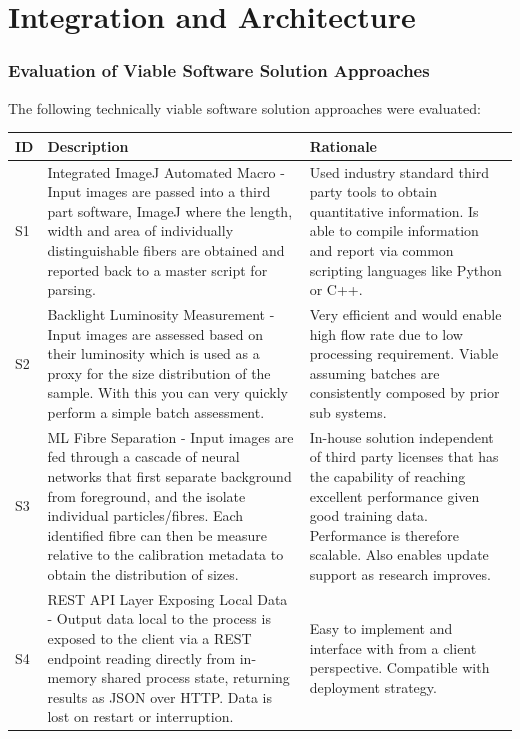 \documentclass[11pt,a4paper]{article}
\begin{document}
\part{Integration and Architecture}

\section{Evaluation of Viable Software Solution Approaches}

The following technically viable software solution approaches were evaluated:

\begin{longtable}{@{}p{1cm}p{7cm}p{7cm}@{}}
\toprule
\textbf{ID} & \textbf{Description} & \textbf{Rationale} \\
\midrule
\endhead
S1 & Integrated ImageJ Automated Macro - Input images are passed into a third part software, ImageJ where the length, width and area of individually distinguishable fibers are  obtained and reported back to a master script for parsing. & Used industry standard third party tools to obtain quantitative information. Is able to compile information and report via common scripting languages like Python or C++. \\ \midrule

S2 & Backlight Luminosity Measurement - Input images are assessed based on their luminosity which is used as a proxy for the size distribution of the sample. With this you can very quickly perform a simple batch assessment. & Very efficient and would enable high flow rate due to low processing requirement. Viable assuming batches are consistently composed by prior sub systems. \\ \midrule

S3 & ML Fibre Separation - Input images are fed through a cascade of neural networks that first separate background from foreground, and the isolate individual particles/fibres. Each identified fibre can then be measure relative to the calibration metadata to obtain the distribution of sizes. & In-house solution independent of third party licenses that has the capability of reaching excellent performance given good training data. Performance is therefore scalable. Also enables update support as research improves. \\ \midrule

S4 & REST API Layer Exposing Local Data - Output data local to the process is exposed to the client via a REST endpoint reading directly from in-memory shared process state, returning results as JSON over HTTP. Data is lost on restart or interruption. & Easy to implement and interface with from a client perspective. Compatible with deployment strategy. \\ \midrule


\end{longtable}
\end{document}
